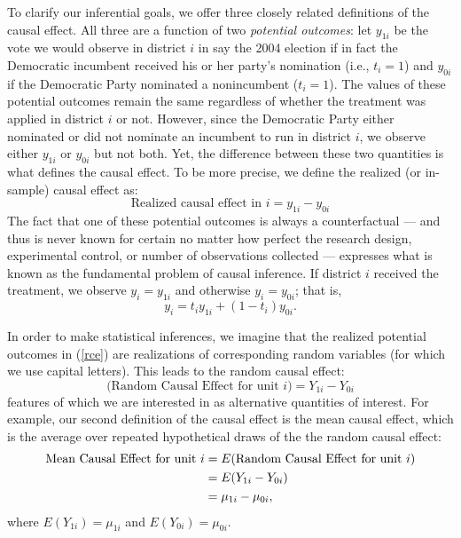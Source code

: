 \documentclass[11pt,titlepage]{article}
\begin{document}
To clarify our inferential goals, we offer three closely related
definitions of the causal effect.  All three are a function of two
\emph{potential outcomes}: let $y_{1i}$ be the vote we would observe
in district $i$ in say the 2004 election if in fact the Democratic
incumbent received his or her party's nomination (i.e., $t_i=1$) and
$y_{0i}$ if the Democratic Party nominated a nonincumbent ($t_i=1$).
The values of these potential outcomes remain the same regardless of
whether the treatment was applied in district $i$ or not.  However,
since the Democratic Party either nominated or did not nominate an
incumbent to run in district $i$, we observe either $y_{1i}$ or
$y_{0i}$ but not both.  Yet, the difference between these two
quantities is what defines the causal effect.  To be more precise, we
define the realized (or in-sample) causal effect as:
\begin{equation}
  \label{rce}
  \text{Realized causal effect in $i$} = y_{1i} - y_{0i}
\end{equation}
The fact that one of these potential outcomes is always a
counterfactual --- and thus is never known for certain no matter how
perfect the research design, experimental control, or number of
observations collected --- expresses what is known as the fundamental
problem of causal inference.  If district $i$ received the treatment,
we observe $y_i=y_{1i}$ and otherwise $y_i=y_{0i}$; that is,
\begin{equation}
  \label{y}
  y_i = t_iy_{1i} + (1-t_i)y_{0i}.
\end{equation}

In order to make statistical inferences, we imagine that the realized
potential outcomes in (\ref{rce}) are realizations of corresponding
random variables (for which we use capital letters).  This leads to
the random causal effect:
\begin{equation}
  \label{rance}
  \text{(Random Causal Effect for unit $i$)}  = Y_{1i} - Y_{0i}
\end{equation}
features of which we are interested in as alternative quantities of
interest.  For example, our second definition of the causal effect is
the mean causal effect, which is the average over repeated
hypothetical draws of the the random causal effect:
\begin{align}
  \label{meance}
  \text{Mean Causal Effect for unit $i$}
  &= E(\mbox{Random Causal Effect for unit $i$})\\ 
  &= E(Y_{1i} - Y_{0i})\\ \notag
  &= \mu_{1i} - \mu_{0i},
\end{align}
where $E(Y_{1i})=\mu_{1i}$ and $E(Y_{0i})=\mu_{0i}$.  
\end{document}

